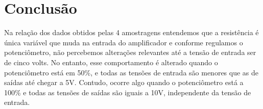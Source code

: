 \documentclass{article}
\begin{document}

\section{Conclusão}

Na relação dos dados obtidos pelas 4 amostragens entendemos que a resistência é única variável que muda na entrada do amplificador e conforme regulamos o potenciômetro, não percebemos alterações relevantes até a tensão de entrada ser de cinco volts. No entanto, esse comportamento é alterado quando o potenciômetro está em 50\%, e todas as tensões de entrada são menores que as de saídas até chegar a 5V. Contudo, ocorre algo quando o potenciômetro está a 100\% e todas as tensões de saídas são iguais a 10V, independente da tensão de entrada.
\end{document}
